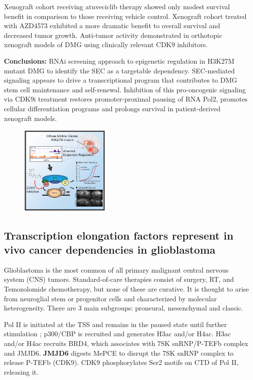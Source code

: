 Xenograft cohort receiving atuveciclib therapy
showed only modest survival benefit in
comparison to those receiving vehicle control.
Xenograft cohort treated with AZD4573
exhibited a more dramatic benefit to overall
survival and decreased tumor growth.
Anti-tumor activity demonstrated in orthotopic xenograft models of DMG using clinically relevant CDK9 inhibitors.

\textbf{Conclusions:}
RNAi screening approach to epigenetic regulation in
H3K27M mutant DMG to identify the SEC as a
targetable dependency.
SEC-mediated signaling appears to drive a
transcriptional program that contributes to DMG stem
cell maintenance and self-renewal.
Inhibition of this pro-oncogenic signaling via CDK9i
treatment restores promoter-proximal pausing of RNA
Pol2, promotes cellular differentiation programs and
prolongs survival in patient-derived xenograft models.

\begin{figure}
\centering
\includegraphics[width=0.4\textwidth]{../_resources/Screen_Shot_2022-12-20_at_12-43-26.png}
\caption{}
\end{figure}

\subsection{Transcription elongation factors represent in vivo cancer dependencies in glioblastoma}
Glioblastoma is the most common of all primary malignant central nervous system (CNS) tumors. Standard-of-care therapies consist of surgery, RT, and Temozolomide chemotherapy, but none of these are curative. It is thought to arise from neuroglial stem or progenitor cells and characterized by molecular heterogeneity. There are 3 main subgroups: proneural, mesenchymal and classic.

Pol II is initiated at the TSS and remains in the paused state until further stimulation ; p300/CBP is recruited and generates H3ac and/or H4ac. H3ac and/or H4ac recruits BRD4, which associates with 7SK snRNP/P-TEFb complex and JMJD6. \textbf{JMJD6} digests MePCE to disrupt the 7SK snRNP complex to release P-TEFb (CDK9). CDK9 phosphorylates Ser2 motifs on CTD of Pol II,  releasing it.

